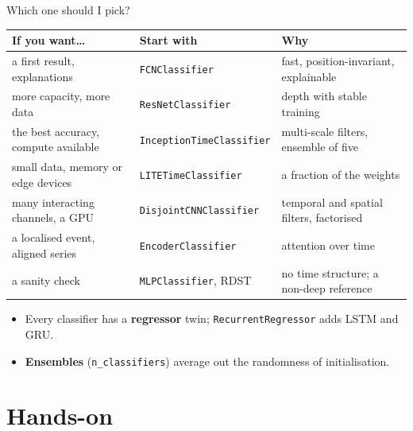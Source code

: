 \documentclass[aspectratio=169,10pt]{beamer}
\begin{document}
\begin{frame}{Which one should I pick?}
  \footnotesize
  \begin{tabular}{@{}lll@{}}
    \toprule
    \textbf{If you want\dots} & \textbf{Start with} & \textbf{Why} \\
    \midrule
    a first result, explanations & \texttt{FCNClassifier} & fast, position-invariant, explainable \\
    more capacity, more data & \texttt{ResNetClassifier} & depth with stable training \\
    the best accuracy, compute available & \texttt{InceptionTimeClassifier} & multi-scale filters, ensemble of five \\
    small data, memory or edge devices & \texttt{LITETimeClassifier} & a fraction of the weights \\
    many interacting channels, a GPU & \texttt{DisjointCNNClassifier} & temporal and spatial filters, factorised \\
    a localised event, aligned series & \texttt{EncoderClassifier} & attention over time \\
    a sanity check & \texttt{MLPClassifier}, RDST & no time structure; a non-deep reference \\
    \bottomrule
  \end{tabular}
  \vspace{0.25cm}
  \begin{itemize}
    \item Every classifier has a \textbf{regressor} twin; \texttt{RecurrentRegressor} adds LSTM and GRU.
    \item \textbf{Ensembles} (\texttt{n\_classifiers}) average out the randomness of initialisation.
  \end{itemize}
\end{frame}

\section{Hands-on}
\end{document}
